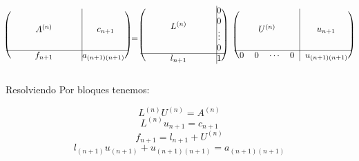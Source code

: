 \begin{itemize}
  \[
  \begin{blockarray}{cccc|c}
    \begin{block}{(cccc@{\hspace*{45pt}}|c@{\hspace*{5pt}})}
    \BAmulticolumn{4}{c|}{\multirow{4}{*}{$A^{(n)}$}}&\BAmulticolumn{1}{c}{\multirow{4}{*}{$c_{n+1}$}}\\
	&&&&\\
    &&&&\\
    &&&&\\
    \cline{1-5}%
    \BAmulticolumn{4}{c|}{f_{n+1}}&a_{(n+1)(n+1)} \\
    \end{block}
  \end{blockarray}
  =
  \begin{blockarray}{cccc|c}
    \begin{block}{(cccc@{\hspace*{45pt}}|c@{\hspace*{5pt}})}
    \BAmulticolumn{4}{c|}{\multirow{4}{*}{$L^{(n)}$}}&0 \\
	&&&& 0\\
    &&&& \vdots\\
    &&&& 0\\
    \cline{1-5}%
    \BAmulticolumn{4}{c|}{l_{n+1}}& 1 \\
    \end{block}
  \end{blockarray}
  \hspace{1em}
  \begin{blockarray}{cccc|c}
    \begin{block}{(cccc|c@{\hspace*{5pt}})}
    \BAmulticolumn{4}{c|}{\multirow{4}{*}{$U^{(n)}$}}&\BAmulticolumn{1}{c}{\multirow{4}{*}{$u_{n+1}$}}\\
	&&&&\\
    &&&&\\
    &&&&\\
    \cline{1-5}%
    0 & 0 & \cdots & 0 & u_{(n+1)(n+1)} \\
    \end{block}
  \end{blockarray}
  \]
  
  Resolviendo Por bloques tenemos:
  
  \begin{equation} \label{demo:Block1}
  	L^{(n)} U^{(n)} = A^{(n)} 
  \end{equation} 
  \begin{equation} \label{demo:Block2}
	L^{(n)} u_{n+1} = c_{n+1} 
  \end{equation}
  \begin{equation} \label{demo:Block3}
	f_{n+1} = l_{n+1} + U^{(n)}
  \end{equation}
  \begin{equation} \label{demo:Block4}
	l_{(n+1)} u_{(n+1)} + u_{(n+1)(n+1)} = a_{(n+1)(n+1)}
  \end{equation}
  

\end{itemize}
